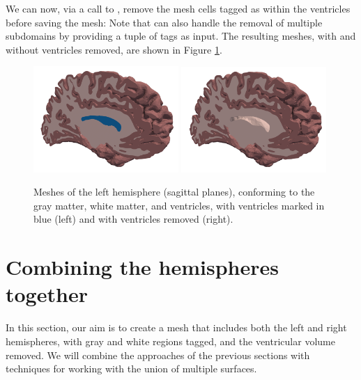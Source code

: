 We can now, via a call to \svmtk{} ,
remove the mesh cells tagged as within the ventricles before saving
the mesh:
Note that  can also handle the removal of
multiple subdomains by providing a tuple of tags as input. The resulting
meshes, with and without ventricles removed, are shown in Figure
\ref{fig:chp4:tags-with-without-ventricles}.
\begin{center}
\begin{figure}
  \includegraphics[width=0.49\textwidth]{./graphics/chp4/ernie-final-comp-b}
  \includegraphics[width=0.49\textwidth]{./graphics/chp4/ernie-final-comp-d}
    \caption{Meshes of the left hemisphere (sagittal planes),
      conforming to the gray matter, white matter, and ventricles, with
      ventricles marked in blue (left) and with ventricles removed (right). 
	}
    \label{fig:chp4:tags-with-without-ventricles}
\end{figure}
\end{center}

\section{Combining the hemispheres together}
\label{sec:chp4-left-right-tagged}

In this section, our aim is to create a mesh that includes both the
left and right hemispheres, with gray and white regions tagged, and
the ventricular volume removed. We will combine the approaches of the
previous sections with \svmtk{} techniques for
working with the union of multiple surfaces. 

